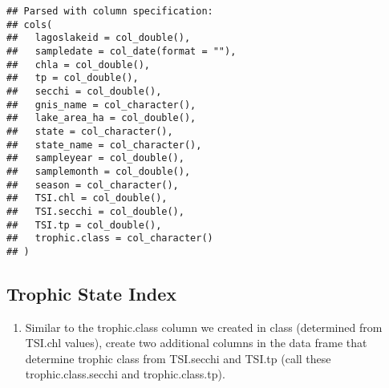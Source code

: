 \documentclass[]{article}
\providecommand{\tightlist}{%
  \setlength{\itemsep}{0pt}\setlength{\parskip}{0pt}}
\begin{document}
\begin{verbatim}
## Parsed with column specification:
## cols(
##   lagoslakeid = col_double(),
##   sampledate = col_date(format = ""),
##   chla = col_double(),
##   tp = col_double(),
##   secchi = col_double(),
##   gnis_name = col_character(),
##   lake_area_ha = col_double(),
##   state = col_character(),
##   state_name = col_character(),
##   sampleyear = col_double(),
##   samplemonth = col_double(),
##   season = col_character(),
##   TSI.chl = col_double(),
##   TSI.secchi = col_double(),
##   TSI.tp = col_double(),
##   trophic.class = col_character()
## )
\end{verbatim}

\hypertarget{trophic-state-index}{%
\subsection{Trophic State Index}\label{trophic-state-index}}

\begin{enumerate}
\def\labelenumi{\arabic{enumi}.}
\setcounter{enumi}{4}
\tightlist
\item
  Similar to the trophic.class column we created in class (determined
  from TSI.chl values), create two additional columns in the data frame
  that determine trophic class from TSI.secchi and TSI.tp (call these
  trophic.class.secchi and trophic.class.tp).
\end{enumerate}
\end{document}

